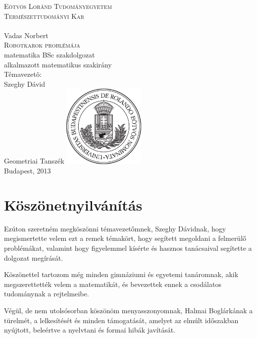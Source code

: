 \documentclass[12pt,a4paper]{report}
\theoremstyle{remark}
\theoremstyle{definition}
\begin{document}

\begin{titlepage}
\begin{center}
{\LARGE \textsc{Eötvös Loránd Tudományegyetem \\ Természettudományi Kar \\}}
\hrulefill \\[2.5cm]
{\huge Vadas Norbert} \\[0.7cm]
{\Huge \textsc{Robotkarok problémája}} \\[0.7cm]
matematika BSc szakdolgozat \\[0.1cm]
alkalmazott matematikus szakirány \\[2.2cm]
{\large Témavezetõ:} \\[0.4cm]
{\Large Szeghy Dávid} \\[0.3cm] 
{\Large Geometriai Tanszék}
\vfill
\includegraphics[width=0.3\textwidth]{./images/elte_cimer_ff}~\\[0.5cm]
{\large Budapest, 2013}
\end{center}
\end{titlepage}

\chapter*{Köszönetnyilvánítás}
Ezúton szeretném megköszönni témavezetőmnek, Szeghy Dávidnak, hogy megismertette velem ezt a remek témakört, hogy 
segített megoldani a felmerülő problémákat, valamint hogy figyelemmel kísérte és hasznos tanácsaival segítette a 
dolgozat megírását.

Köszönettel tartozom még minden gimnáziumi és egyetemi tanáromnak, akik megszerettették velem a matematikát, és 
bevezettek ennek a csodálatos tudománynak a rejtelmeibe.

Végül, de nem utolsósorban köszönöm menyasszonyomnak, Halmai Boglárkának a türelmét, a lelkesítését és minden 
támogatását, amelyet az elmúlt időszakban nyújtott, beleértve a nyelvtani és formai hibák javítását.
\end{document}
